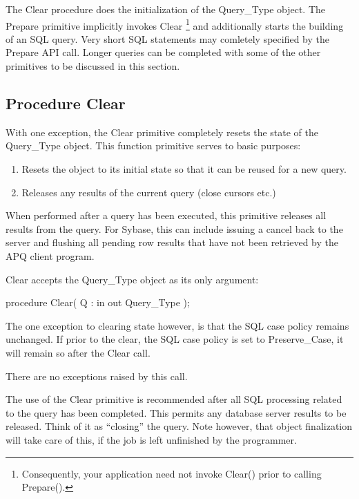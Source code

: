 \documentclass[english,letterpaper]{book}
\begin{document}
The Clear procedure does the initialization of the Query\_Type object.
The Prepare primitive implicitly invokes Clear
\footnote{Consequently, your application need not invoke Clear() prior to calling
Prepare().} and additionally starts the building of an SQL query. Very short
SQL statements may comletely specified by the Prepare API call. Longer
queries can be completed with some of the other primitives to be discussed
in this section.

\subsection{Procedure Clear}

With one exception, the Clear primitive completely resets the state
of the Query\_Type object. This function primitive serves to basic
purposes:

\begin{enumerate}
\item Resets the object to its initial state so that it can be reused for a new query.
\item Releases any results of the current query (close cursors etc.)
\end{enumerate}

When performed after a query has been executed, this primitive releases
all results from the query. For Sybase, this can include issuing a
cancel back to the server and flushing all pending row results that
have not been retrieved by the APQ client program.

Clear accepts the Query\_Type object as its only argument:

\begin{Code}
procedure Clear(
   Q : in out Query_Type
);
\end{Code}

The one exception to clearing state however, is that the SQL case
policy remains unchanged. If prior to the clear, the SQL case policy
is set to Preserve\_Case, it will remain so after the Clear call.

There are no exceptions raised by this call.

The use of the Clear primitive is recommended after all SQL processing
related to the query has been completed. This permits any database
server results to be released. Think of it as ``closing'' the
query. Note however, that object finalization will take care of this,
if the job is left unfinished by the programmer.
\end{document}
